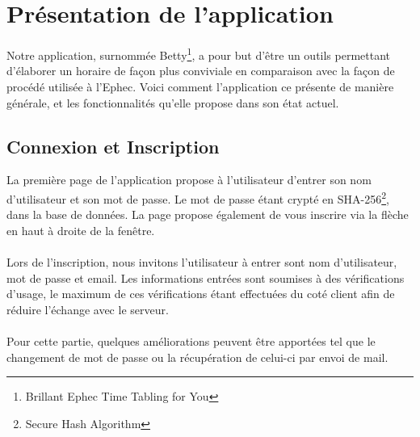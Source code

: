 

\chapter{Présentation de l'application}
Notre application, surnommée Betty\footnote{Brillant Ephec Time Tabling for You}, a pour but d'être un outils permettant d'élaborer un horaire de façon plus conviviale en comparaison avec la façon de procédé utilisée à l'Ephec. Voici comment l'application ce présente de manière générale, et les fonctionnalités qu'elle propose dans son état actuel.

\section{Connexion et Inscription}

La première page de l'application propose à l'utilisateur d'entrer son nom d'utilisateur et son mot de passe. Le mot de passe étant crypté en SHA-256\footnote{Secure Hash Algorithm}, dans la base de données. La page propose également de vous inscrire via la flèche en haut à droite de la fenêtre.\\
\\
Lors de l'inscription, nous invitons l'utilisateur à entrer sont nom d'utilisateur, mot de passe et email. Les informations entrées sont soumises à des vérifications d'usage, le maximum de ces vérifications étant effectuées du coté client afin de réduire l'échange avec le serveur.\\
\\
Pour cette partie, quelques améliorations peuvent être apportées tel que le changement de mot de passe ou la récupération de celui-ci par envoi de mail.

